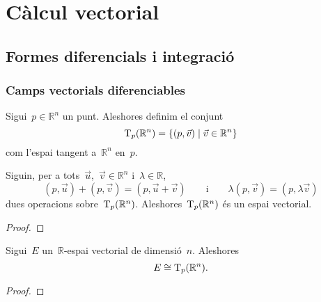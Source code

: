 \documentclass[../../main.tex]{subfiles}
\begin{document}
\begin{comment}
    Calcular curvatura de Gauss i curvatura mitjana d'un helicoide.
    (6.7)
    \[
        \varphi(u,v)=(u\cos(v),u\sin(v),av).
    \]
    Línies de curvatura (7.3)
    Fer-ho tot per helicoides lol
\end{comment}


\chapter{Càlcul vectorial}
\section{Formes diferencials i integració}
    \subsection{Camps vectorials diferenciables}
    \begin{definition}
        \label{def:espai tangent a Rn}
        Sigui~\(p\in\mathbb{R}^{n}\) un punt.
        Aleshores definim el conjunt
        \begin{equation*}
            \operatorname{T}_{p}(\mathbb{R}^{n})=\{(p,\vec{v})\mid\vec{v}\in\mathbb{R}^{n}\}
        \end{equation*}
        com l'espai tangent a~\(\mathbb{R}^{n}\) en~\(p\).
    \end{definition}
    \begin{proposition}
        \label{prop:l'espai tangent a Rn és un espai vectorial}
        Siguin, per a tots~\(\vec{u}\),~\(\vec{v}\in\mathbb{R}^{n}\) i~\(\lambda\in\mathbb{R}\),
        \begin{equation*}
            (p,\vec{u})+(p,\vec{v})=(p,\vec{u}+\vec{v})
            \qquad\text{i}\qquad
            \lambda(p,\vec{v})=(p,\lambda\vec{v})
        \end{equation*}
        dues operacions sobre~\(\operatorname{T}_{p}(\mathbb{R}^{n})\).
        Aleshores~\(\operatorname{T}_{p}(\mathbb{R}^{n})\) és un espai vectorial.
        \begin{proof}
        \end{proof}
    \end{proposition}
    \begin{observation}
        \label{prop:l'espai tangent a Rn és isomorf a un R-espai vectorial de dimensió n}
        Sigui~\(E\) un~\(\mathbb{R}\)-espai vectorial de dimensió~\(n\).
        Aleshores
        \begin{equation*}
            E\cong\operatorname{T}_{p}(\mathbb{R}^{n}).
        \end{equation*}
        \begin{proof}
        \end{proof}
    \end{observation}
\end{document}
